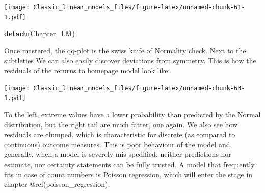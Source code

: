 \documentclass[]{svmono}
\newenvironment{Shaded}{\begin{snugshade}}{\end{snugshade}}
\newcommand{\KeywordTok}[1]{\textcolor[rgb]{0.13,0.29,0.53}{\textbf{#1}}}
\newcommand{\DataTypeTok}[1]{\textcolor[rgb]{0.13,0.29,0.53}{#1}}
\newcommand{\DecValTok}[1]{\textcolor[rgb]{0.00,0.00,0.81}{#1}}
\newcommand{\StringTok}[1]{\textcolor[rgb]{0.31,0.60,0.02}{#1}}
\newcommand{\OperatorTok}[1]{\textcolor[rgb]{0.81,0.36,0.00}{\textbf{#1}}}
\newcommand{\NormalTok}[1]{#1}
\theoremstyle{definition}
\theoremstyle{definition}
\theoremstyle{definition}
\theoremstyle{remark}
\begin{document}
\begin{Shaded}
\end{Shaded}

\texttt{[image: Classic\_linear\_models\_files/figure-latex/unnamed-chunk-61-1.pdf]}

\begin{Shaded}
\begin{Highlighting}[]
\KeywordTok{detach}\NormalTok{(Chapter_LM)}
\end{Highlighting}
\end{Shaded}

Once mastered, the qq-plot is the swiss knife of Normality check. Next
to the subtleties We can also easily discover deviations from symmetry.
This is how the residuals of the returns to homepage model look like:

\begin{Shaded}
\end{Shaded}

\texttt{[image: Classic\_linear\_models\_files/figure-latex/unnamed-chunk-63-1.pdf]}

To the left, extreme values have a lower probability than predicted by
the Normal distribution, but the right tail are much fatter, one again.
We also see how residuals are clumped, which is characteristic for
discrete (as compared to continuous) outcome measures. This is poor
behaviour of the model and, generally, when a model is severely
mis-spedified, neither predictions nor estimate, nor certainty
statements can be fully trusted. A model that frequently fits in case of
count numbers is Poisson regression, which will enter the stage in
chapter @ref(poisson\_regression).
\end{document}
